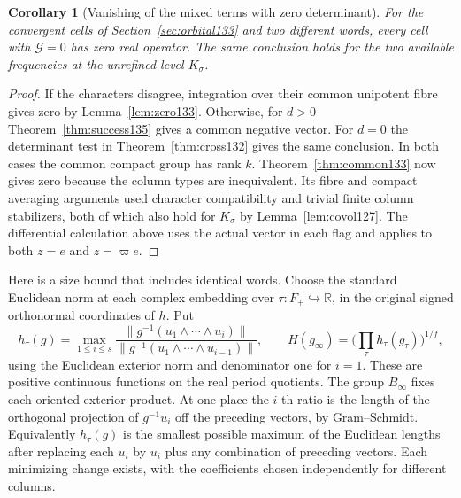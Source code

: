 \documentclass[a4paper,11pt]{article}
\newtheorem{corollary}[proposition]{Corollary}
\theoremstyle{definition}
\theoremstyle{remark}
\numberwithin{equation}{section}
\begin{document}
\begin{corollary}[Vanishing of the mixed terms with zero determinant]
\label{cor:zero135}
For the convergent cells of Section~\ref{sec:orbital133} and two
different words, every cell with \(\mathcal G=0\) has zero real
operator. The same conclusion holds for the two available
frequencies at the unrefined level \(K_\sigma\).
\end{corollary}
\begin{proof}
If the characters disagree, integration over their common
unipotent fibre gives zero by Lemma~\ref{lem:zero133}.
Otherwise, for \(d>0\) Theorem~\ref{thm:success135} gives a
common negative vector. For \(d=0\) the determinant test in
Theorem~\ref{thm:cross132} gives the same conclusion. In both
cases the common compact group has rank \(k\). Theorem~\ref{thm:common133}
now gives zero because the column types are inequivalent.
Its fibre and compact averaging arguments used character
compatibility and trivial finite column stabilizers, both of
which also hold for \(K_\sigma\) by Lemma~\ref{lem:covol127}.
The differential calculation above uses the actual vector
in each flag and applies to both \(z=e\) and \(z=\varpi e\).
\end{proof}

Here is a size bound that includes identical words. Choose
the standard Euclidean norm at each complex embedding over
\(\tau:F_+\hookrightarrow\mathbb R\), in the original signed
orthonormal coordinates of \(h\). Put
\[
 h_\tau(g)=\max_{1\le i\le s}
 \frac{\|g^{-1}(u_1\wedge\cdots\wedge u_i)\|}
      {\|g^{-1}(u_1\wedge\cdots\wedge u_{i-1})\|},\qquad
 H(g_\infty)=\biggl(\prod_\tau h_\tau(g_\tau)\biggr)^{1/f},
\]
using the Euclidean exterior norm and denominator one for \(i=1\).
These are positive continuous functions on the real period
quotients. The group \(B_\infty\) fixes each oriented exterior
product. At one place the \(i\)-th ratio is the length of the
orthogonal projection of \(g^{-1}u_i\) off the preceding vectors,
by Gram--Schmidt. Equivalently \(h_\tau(g)\) is the smallest
possible maximum of the Euclidean lengths after replacing each
\(u_i\) by \(u_i\) plus any combination of preceding vectors.
Each minimizing change exists, with the coefficients chosen
independently for different columns.
\end{document}

